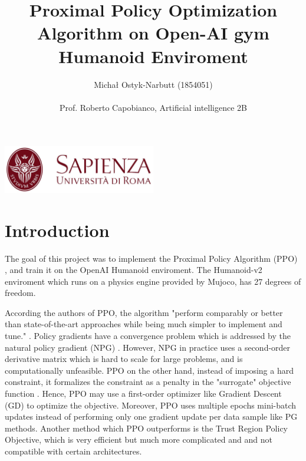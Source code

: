 \documentclass[12pt,a4paper]{article}
\begin{document}
\title{Proximal Policy Optimization Algorithm on Open-AI gym Humanoid Enviroment}
\author{Michał Ostyk-Narbutt (1854051)\\ \\ Prof. Roberto Capobianco, Artificial intelligence 2B}

\maketitle


\begin{center}
\includegraphics[width=0.5\textwidth]{img/sapienza_logo.jpg}
\end{center}
\maketitle
\tableofcontents
\clearpage
\section{Introduction}
The goal of this project was to implement the Proximal Policy Algorithm (PPO) \cite{PPO}, and train it on the OpenAI Humanoid enviroment. The Humanoid-v2 enviroment which runs on a physics engine provided by Mujoco, has 27 degrees of freedom. 

According the authors of PPO, the algorithm "perform comparably or better than state-of-the-art approaches while being much simpler to implement and tune." \cite{PPO}. Policy gradients have a convergence problem which is addressed  by the natural policy gradient (NPG) \cite{NPG}. However, NPG in practice uses a second-order derivative matrix which is hard to scale for large problems, and is computationally unfeasible. PPO on the other hand, instead of imposing a hard constraint, it  formalizes the constraint as a penalty in the "surrogate" objective function \cite{hui}. Hence, PPO may use a first-order optimizer like Gradient Descent (GD) to optimize the objective. Moreover, PPO uses multiple epochs mini-batch updates  instead of performing only one gradient update per data sample like PG methods. Another method which PPO outperforms is the Trust Region Policy Objective, which is very efficient but much more complicated and and not compatible with certain architectures.
\end{document}
